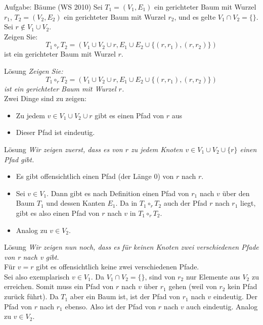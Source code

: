 \begin{frame}{Aufgabe: Bäume (WS 2010) }
	Sei $T_1 = (V_1 , E_1 )$ ein gerichteter Baum mit Wurzel $r_1$, $T_2 = (V_2 , E_2 )$ ein gerichteter Baum mit Wurzel $r_2$, und es gelte $V_1 \cap V_2 = \{\}$. Sei $r \not\in V_1 \cup V_2$. \\
Zeigen Sie: $$T_1 \circ_r T_2 = (V_1 \cup V_2 \cup {r}, E_1 \cup E_2 \cup \{(r, r_1 ), (r, r_2 )\})$$ ist ein gerichteter Baum mit Wurzel $r$.
\end{frame}

\begin{frame}{Lösung}
	\textit{Zeigen Sie: $$T_1 \circ_r T_2 = (V_1 \cup V_2 \cup {r}, E_1 \cup E_2 \cup \{(r, r_1 ), (r, r_2 )\})$$ ist ein gerichteter Baum mit Wurzel $r$.} \\[2em] \pause
	Zwei Dinge sind zu zeigen:
	\begin{itemize}[<+->]
		\item Zu jedem $v \in V_1 \cup V_2 \cup {r}$ gibt es einen Pfad von $r$ aus
		\item Dieser Pfad ist eindeutig.
	\end{itemize}
\end{frame}

\begin{frame}{Lösung}
	\textit{Wir zeigen zuerst, dass es von $r$ zu jedem Knoten $v \in V_1 \cup V_2 \cup \{r\}$ einen Pfad
gibt.} \\[2em]
	\pause
	\begin{itemize}[<+->]
		\item Es gibt offensichtlich einen Pfad (der Länge 0) von $r$ nach $r$.
		\item Sei $v \in V_1$. Dann gibt es nach Definition einen Pfad von $r_1$ nach $v$ über den Baum $T_1$ und dessen Kanten $E_1$. Da in $T_1 \circ_r T_2$ auch der Pfad $r$ nach $r_1$ liegt, gibt es also einen Pfad von $r$ nach $v$ in $T_1 \circ_r T_2$.
		\item Analog zu $v \in V_2$.
	\end{itemize}
\end{frame}

\begin{frame}{Lösung}
	\textit{Wir zeigen nun noch, dass es für keinen Knoten zwei verschiedenen Pfade von r nach v gibt.} \\[2em]\pause
	Für $v = r$ gibt es offensichtlich keine zwei verschiedenen Pfade. \pause \\ Sei also exemplarisch $v \in V_1$. Da $V_1 \cap V_2 = \{\}$, sind von $r_2$ nur Elemente aus $V_2$ zu erreichen. Somit muss ein Pfad von $r$ nach $v$ über $r_1$ gehen (weil von $r_2$ kein Pfad zurück führt). \pause Da $T_1$ aber ein Baum ist, ist der Pfad von $r_1$ nach $v$ eindeutig. Der Pfad von $r$ nach $r_1$ ebenso. \pause Also ist der Pfad von $r$ nach $v$ auch eindeutig. Analog zu $v \in V_2$.
\end{frame}

